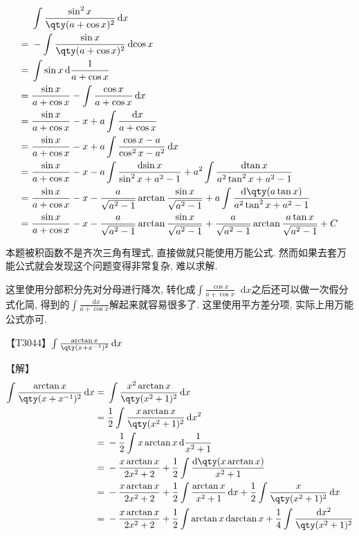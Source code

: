 \documentclass{ctexbook}
\newcommand*{\dif}{\mathop{}\!\mathrm{d}}
\begin{document}
{\begin{align*}
{}&\int\frac{\sin^{2}{x}}{\qty(a+\cos{x})^{2}}\dif{x}\\
={}&-\int\frac{\sin{x}}{\qty(a+\cos{x})^{2}}\dif{\cos{x}}\\
={}&\int\sin{x}\dif{\frac{1}{a+\cos{x}}}\\
={}&\frac{\sin{x}}{a+\cos{x}}-\int\frac{\cos{x}}{a+\cos{x}}\dif{x}\\
={}&\frac{\sin{x}}{a+\cos{x}}-x+a\int\frac{\dif{x}}{a+\cos{x}}\\
={}&\frac{\sin{x}}{a+\cos{x}}-x+a\int\frac{\cos{x}-a}{\cos^{2}{x}-a^{2}}\dif{x}\\
={}&\frac{\sin{x}}{a+\cos{x}}-x-a\int\frac{\dif{\sin{x}}}{\sin^{2}{x}+a^{2}-1}+a^{2}\int\frac{\dif{\tan{x}}}{a^{2}\tan^{2}{x}+a^{2}-1}\\
={}&\frac{\sin{x}}{a+\cos{x}}-x-\frac{a}{\sqrt{a^{2}-1}}\arctan{\frac{\sin{x}}{\sqrt{a^{2}-1}}}+a\int\frac{\dif{\qty(a\tan{x})}}{a^{2}\tan^{2}{x}+a^{2}-1}\\
={}&\frac{\sin{x}}{a+\cos{x}}-x-\frac{a}{\sqrt{a^{2}-1}}\arctan{\frac{\sin{x}}{\sqrt{a^{2}-1}}}+\frac{a}{\sqrt{a^{2}-1}}\arctan{\frac{a\tan{x}}{\sqrt{a^{2}-1}}}+C
\end{align*}\par
{\kaishu 本题被积函数不是齐次三角有理式, 直接做就只能使用万能公式. 然而如果去套万能公式就会发现这个问题变得非常复杂, 难以求解. \par
这里使用分部积分先对分母进行降次, 转化成$\int\frac{\cos{x}}{a+\cos{x}}\dif{x}$之后还可以做一次假分式化简, 得到的$\int\frac{\dif{x}}{a+\cos{x}}$解起来就容易很多了. 这里使用平方差分项, 实际上用万能公式亦可. \par}
{\color{red}【T3044】}$\int\frac{\arctan{x}}{\qty(x+x^{-1})^{2}}\dif{x}$\par
【解】
\begin{align*}
\int\frac{\arctan{x}}{\qty(x+x^{-1})^{2}}\dif{x}={}&\int\frac{x^{2}\arctan{x}}{\qty(x^{2}+1)^{2}}\dif{x}\\
={}&\frac{1}{2}\int\frac{x\arctan{x}}{\qty(x^{2}+1)^{2}}\dif{x^{2}}\\
={}&-\frac{1}{2}\int x\arctan{x}\dif{\frac{1}{x^{2}+1}}\\
={}&-\frac{x\arctan{x}}{2x^{2}+2}+\frac{1}{2}\int\frac{\dif{\qty(x\arctan{x})}}{x^{2}+1}\\
={}&-\frac{x\arctan{x}}{2x^{2}+2}+\frac{1}{2}\int\frac{\arctan{x}}{x^{2}+1}\dif{x}+\frac{1}{2}\int\frac{x}{\qty(x^{2}+1)^{2}}\dif{x}\\
={}&-\frac{x\arctan{x}}{2x^{2}+2}+\frac{1}{2}\int\arctan{x}\dif{\arctan{x}}+\frac{1}{4}\int\frac{\dif{x^{2}}}{\qty(x^{2}+1)^{2}}\\

\end{align*}}
\end{document}
